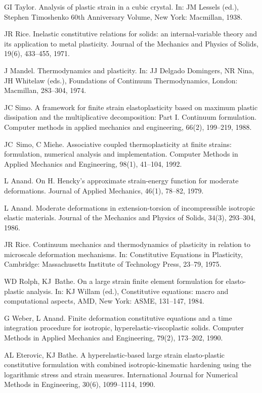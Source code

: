 \documentclass[preprint,review,12pt,sort&compress]{elsarticle}%
\begin{document}
\begin{thebibliography}{99}
GI Taylor. Analysis of plastic strain in a cubic crystal.
In: JM Lessels (ed.), Stephen Timoshenko 60th Anniversary Volume, New York:
Macmillan, 1938.

JR Rice. Inelastic constitutive relations for solids: an
internal-variable theory and its application to metal plasticity. Journal of
the Mechanics and Physics of Solids, 19(6), 433--455, 1971.

J Mandel. Thermodynamics and plasticity. In: JJ Delgado
Domingers, NR Nina, JH Whitelaw (eds.), Foundations of Continuum
Thermodynamics, London: Macmillan, 283--304, 1974.

JC Simo. A framework for finite strain elastoplasticity based
on maximum plastic dissipation and the multiplicative decomposition: Part I.
Continuum formulation. Computer methods in applied mechanics and engineering,
66(2), 199--219, 1988.

JC\ Simo, C Miehe. Associative coupled thermoplasticity
at finite strains: formulation, numerical analysis and implementation.
Computer Methods in Applied Mechanics and Engineering, 98(1), 41--104, 1992.

L Anand. On H. Hencky's approximate strain-energy function
for moderate deformations. Journal of Applied Mechanics, 46(1), 78--82, 1979.

L Anand. Moderate deformations in extension-torsion of
incompressible isotropic elastic materials. Journal of the Mechanics and
Physics of Solids, 34(3), 293--304, 1986.

JR Rice. Continuum mechanics and thermodynamics of plasticity
in relation to microscale deformation mechanisms. In: Constitutive Equations
in Plasticity, Cambridge: Massachusetts Institute of Technology Press, 23--79, 1975.

WD Rolph, KJ\ Bathe. On a large strain finite element
formulation for elasto-plastic analysis. In: KJ Willam (ed.), Constitutive
equations: macro and computational aspects, AMD, New York: ASME, 131--147, 1984.

G Weber, L Anand. Finite deformation constitutive
equations and a time integration procedure for isotropic,
hyperelastic-viscoplastic solids. Computer Methods in Applied Mechanics and
Engineering, 79(2), 173--202, 1990.

AL Eterovic, KJ Bathe. A hyperelastic-based large
strain elasto-plastic constitutive formulation with combined
isotropic-kinematic hardening using the logarithmic stress and strain
measures. International Journal for Numerical Methods in Engineering, 30(6),
1099--1114, 1990.


\end{thebibliography}
\end{document}
